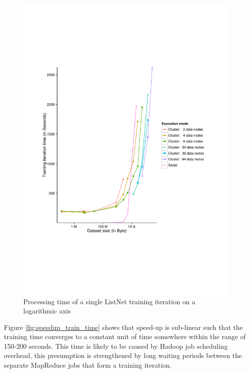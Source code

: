 \begin{figure}
\centering
\includegraphics[trim=0cm 5cm 0cm 5cm, scale=0.7]{gfx/time_single_logx.pdf}
\caption{Processing time of a single ListNet training iteration on a logarithmic axis}
\label{fig:listnet_train_time_log}
\end{figure}

Figure \ref{fig:speedup_train_time} shows that speed-up is sub-linear such that the training time converges to a constant unit of time somewhere within the range of 150-200 seconds. This time is likely to be caused by Hadoop job scheduling overhead, this presumption is strengthened by long waiting periods between the separate MapReduce jobs that form a training iteration. 

